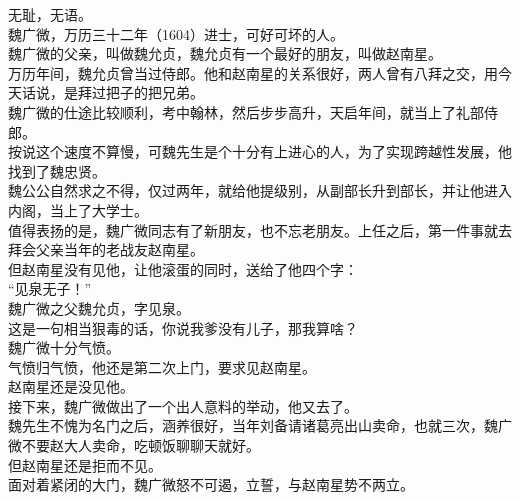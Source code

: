 \begin{multicols}{\theparacolNo}
无耻，无语。\\

魏广微，万历三十二年（1604）进士，可好可坏的人。\\

魏广微的父亲，叫做魏允贞，魏允贞有一个最好的朋友，叫做赵南星。\\

万历年间，魏允贞曾当过侍郎。他和赵南星的关系很好，两人曾有八拜之交，用今天话说，是拜过把子的把兄弟。\\

魏广微的仕途比较顺利，考中翰林，然后步步高升，天启年间，就当上了礼部侍郎。\\

按说这个速度不算慢，可魏先生是个十分有上进心的人，为了实现跨越性发展，他找到了魏忠贤。\\

魏公公自然求之不得，仅过两年，就给他提级别，从副部长升到部长，并让他进入内阁，当上了大学士。\\

值得表扬的是，魏广微同志有了新朋友，也不忘老朋友。上任之后，第一件事就去拜会父亲当年的老战友赵南星。\\

但赵南星没有见他，让他滚蛋的同时，送给了他四个字：\\

“见泉无子！”\\

魏广微之父魏允贞，字见泉。\\

这是一句相当狠毒的话，你说我爹没有儿子，那我算啥？\\

魏广微十分气愤。\\

气愤归气愤，他还是第二次上门，要求见赵南星。\\

赵南星还是没见他。\\

接下来，魏广微做出了一个出人意料的举动，他又去了。\\

魏先生不愧为名门之后，涵养很好，当年刘备请诸葛亮出山卖命，也就三次，魏广微不要赵大人卖命，吃顿饭聊聊天就好。\\

但赵南星还是拒而不见。\\

面对着紧闭的大门，魏广微怒不可遏，立誓，与赵南星势不两立。\\


\end{multicols}
